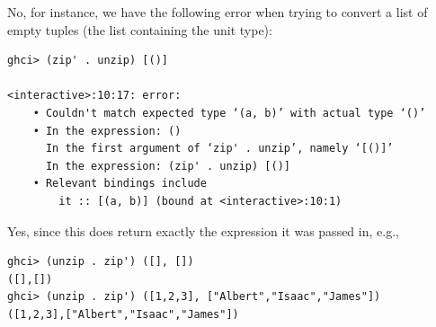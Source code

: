 No, for instance, we have the following error when trying to convert a list
of empty tuples (the list containing the unit type):
\begin{lstlisting}
ghci> (zip' . unzip) [()]

<interactive>:10:17: error:
    • Couldn't match expected type ‘(a, b)’ with actual type ‘()’
    • In the expression: ()
      In the first argument of ‘zip' . unzip’, namely ‘[()]’
      In the expression: (zip' . unzip) [()]
    • Relevant bindings include
        it :: [(a, b)] (bound at <interactive>:10:1)
\end{lstlisting}

Yes, since this does return exactly the expression it was passed in, e.g.,
\begin{lstlisting}
ghci> (unzip . zip') ([], [])
([],[])
ghci> (unzip . zip') ([1,2,3], ["Albert","Isaac","James"])
([1,2,3],["Albert","Isaac","James"])
\end{lstlisting}
